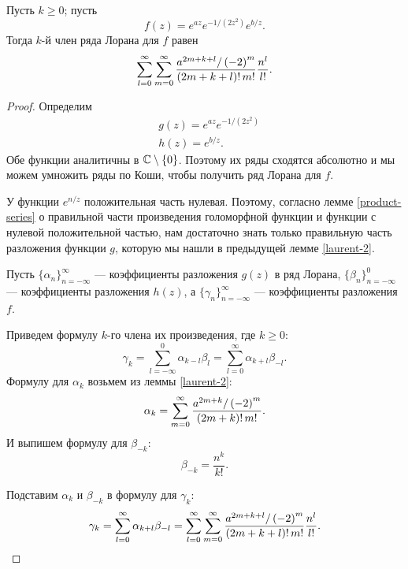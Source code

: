 \documentclass[../paper.tex]{subfiles}
\begin{document}
\begin{Lem}[Правильная часть ряда Лорана для $f(z) = e^{az} e^{-1/(2s^2)} e^{n/s}$]
\label{laurent-3}
Пусть $k \ge 0$; пусть
\[
    f(z) = e^{az} e^{-1/(2z^2)} e^{b/z}
.\]
Тогда $k$-й член ряда Лорана для $f$ равен
\[
    \sum_{l=0}^{\infty}
    \sum_{m=0}^{\infty} \frac{a^{2m+k+l} / \left( -2 \right)^m}{(2m+k+l)!\,m!} \\
    \frac{n^l}{l!}
.\]
\end{Lem}
\begin{proof}
Определим
\begin{align*}
    & g(z) = e^{az} e^{-1/(2z^2)} \\
    & h(z) = e^{b/z}
.\end{align*}
Обе функции аналитичны в $\mathbb{C} \setminus \{0\}$.
Поэтому их ряды сходятся абсолютно и мы можем умножить ряды по Коши, чтобы получить ряд Лорана для $f$.

У функции $e^{n/z}$ положительная часть нулевая.
Поэтому, согласно лемме \ref{product-series} о правильной части произведения голоморфной функции и функции с нулевой положительной частью, 
нам достаточно знать только правильную часть разложения функции $g$, которую мы нашли в предыдущей лемме \ref{laurent-2}.

Пусть $\{\alpha_n\}_{n=-\infty}^\infty$ --- коэффициенты разложения $g(z)$ в ряд Лорана, $\{\beta_n\}_{n=-\infty}^0$ --- коэффициенты разложения $h(z)$,
а $\{\gamma_n\}_{n=-\infty}^\infty$ --- коэффициенты разложения $f$.

Приведем формулу $k$-го члена их произведения, где $k \ge 0$:
\[
    \gamma_k =
    \sum_{l=-\infty}^{0} \alpha_{k-l} \beta_l =
    \sum_{l=0}^{\infty} \alpha_{k+l} \beta_{-l}
.\]
Формулу для $\alpha_k$ возьмем из леммы \ref{laurent-2}:
\[
	\alpha_k = \sum_{m=0}^{\infty} \frac{a^{2m+k} / \left( -2 \right)^m}{(2m+k)!\,m!} \\
.\]
И выпишем формулу для $\beta_{-k}$:
\[
	\beta_{-k} = \frac{n^k}{k!}
.\]

Подставим $\alpha_k$ и $\beta_{-k}$ в формулу для $\gamma_k$:
\[
    \gamma_k =
    \sum_{l=0}^{\infty} \alpha_{k+l} \beta_{-l} =
%
    \sum_{l=0}^{\infty}
    \sum_{m=0}^{\infty} \frac{a^{2m+k+l} / \left( -2 \right)^m}{(2m+k+l)!\,m!} \\
    \frac{n^l}{l!}
.\]
\end{proof}
\end{document}

